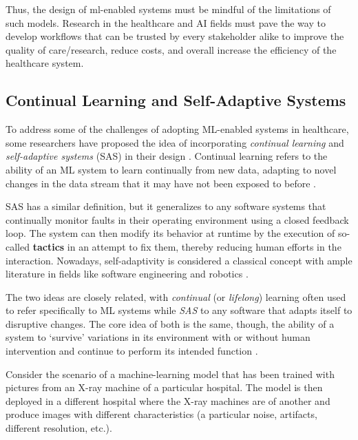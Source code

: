 \documentclass[../main.tex]{subfiles}
\begin{document}
    Thus, the design of ml-enabled systems must be mindful of the limitations of such models. Research in the healthcare and AI fields must pave the way to develop workflows that can be trusted by every stakeholder alike to improve the quality of care/research, reduce costs, and overall increase the efficiency of the healthcare system.


    \subsection{Continual Learning and Self-Adaptive Systems} \label{sec:lifelong_adaptive_systems}

    To address some of the challenges of adopting ML-enabled systems in healthcare, some researchers have proposed the idea of incorporating \textit{continual learning} and \textit{self-adaptive systems} (SAS) in their design \cite{casimiro_self-adaptive_2022,huyen_designing_2022}. Continual learning refers to the ability of an ML system to learn continually from new data, adapting to novel changes in the data stream that it may have not been exposed to before \cite{parisi_continual_2019}.
    
    SAS has a similar definition, but it generalizes to any software systems that continually monitor faults in their operating environment using a closed feedback loop. The system can then modify its behavior at runtime by the execution of so-called \textbf{tactics} in an attempt to fix them, thereby reducing human efforts in the interaction. Nowadays, self-adaptivity is considered a classical concept with ample literature in fields like software engineering and robotics \cite{macias-escrivaSelfadaptiveSystemsSurvey2013,casimiro_self-adaptive_2022}.

    \clearpage
    
    The two ideas are closely related, with \textit{continual} (or \textit{lifelong}) learning often used to refer specifically to ML systems while \textit{SAS} to any software that adapts itself to disruptive changes. The core idea of both is the same, though, the ability of a system to `survive' variations in its environment with or without human intervention and continue to perform its intended function \cite{macias-escrivaSelfadaptiveSystemsSurvey2013}.

    Consider the scenario of a machine-learning model that has been trained with pictures from an X-ray machine of a particular hospital. The model is then deployed in a different hospital where the X-ray machines are of another and produce images with different characteristics (a particular noise, artifacts, different resolution, etc.). 
    
\end{document}
